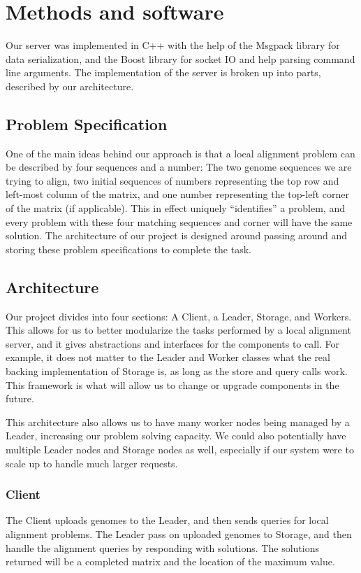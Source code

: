 \documentclass[12pt]{article}
\begin{document}
\section{Methods and software}

Our server was implemented in C++ with the help of the Msgpack library for data serialization, and the Boost library for socket IO and help parsing command line arguments. The implementation of the server is broken up into parts, described by our architecture.

\subsection{Problem Specification}
One of the main ideas behind our approach is that a local alignment problem can be described by four sequences and a number: The two genome sequences we are trying to align, two initial sequences of numbers representing the top row and left-most column of the matrix, and one number representing the top-left corner of the matrix (if applicable). This in effect uniquely ``identifies'' a problem, and every problem with these four matching sequences and corner will have the same solution. The architecture of our project is designed around passing around and storing these problem specifications to complete the task.


\subsection{Architecture}
Our project divides into four sections: A Client, a Leader, Storage, and Workers. This allows for us to better modularize the tasks performed by a local alignment server, and it gives abstractions and interfaces for the components to call. For example, it does not matter to the Leader and Worker classes what the real backing implementation of Storage is, as long as the store and query calls work. This framework is what will allow us to change or upgrade components in the future. 

This architecture also allows us to have many worker nodes being managed by a Leader, increasing our problem solving capacity. 
We could also potentially have multiple Leader nodes and Storage nodes as well, especially if our system were to scale up to handle much larger requests.

\subsubsection{Client}
The Client uploads genomes to the Leader, and then sends queries for local alignment problems. The Leader pass on uploaded genomes to Storage, and then handle the alignment queries by responding with solutions. The solutions returned will be a completed matrix and the location of the maximum value.
\end{document}
